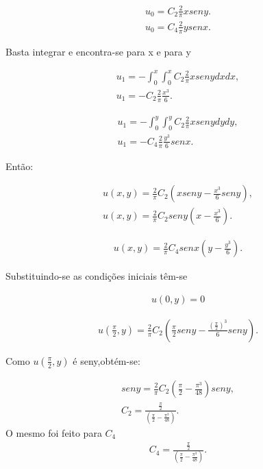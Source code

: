 \begin{gather}
u_{0} = C_{2}\frac{2}{\pi}xseny.\nonumber\\
u_{0} = C_{4}\frac{2}{\pi}ysenx.
\end{gather}

Basta integrar e encontra-se para x e para y


\begin{gather}
u_{1} = -\int_0^x \int_0^x C_{2}\frac{2}{\pi}xsenydxdx,\nonumber\\
u_{1} = -C_{2}\frac{2}{\pi}\frac{x^3}
{6}.
\end{gather}

\begin{gather}
u_{1} = -\int_0^y \int_0^y C_{2}\frac{2}{\pi}xsenydydy,\nonumber\\
u_{1} = -C_{4}\frac{2}{\pi}\frac{y^3}{6}senx.
\end{gather}

Então:

\begin{gather}
u(x,y) = \frac{2}{\pi}C_{2}\left(xseny - \frac{x^3}{6}seny\right),\nonumber\\
u(x,y) = \frac{2}{\pi}C_{2}seny\left(x - \frac{x^3}{6}\right).
\end{gather}

\begin{gather}
u(x,y) = \frac{2}{\pi}C_{4}senx\left(y - \frac{y^3}{6}\right).
\end{gather}

Substituindo-se as  condições iniciais têm-se

\begin{gather}
u(0,y) = 0
\end{gather}

\begin{gather}
u\left(\frac{\pi}{2},y\right) = \frac{2}{\pi}C_{2}\left(\frac{\pi}{2}seny - \frac{(\frac{\pi}{2})^3}{6}seny\right).
\end{gather}

Como $u\left(\frac{\pi}{2},y\right)$ é seny,obtém-se:

\begin{gather}
seny = \frac{2}{\pi}C_{2}\left(\frac{\pi}{2} - \frac{\pi^3}{48}\right)seny,\nonumber\\
C_{2} = \frac{\frac{\pi}{2}}{\left(\frac{\pi}{2}-\frac{\pi^3}{48}\right)}.
\end{gather}
O mesmo foi feito para $C_{4}$ 
\begin{gather}
C_{4} = \frac{\frac{\pi}{2}}{\left(\frac{\pi}{2}-\frac{\pi^3}{48}\right)}.
\end{gather}


